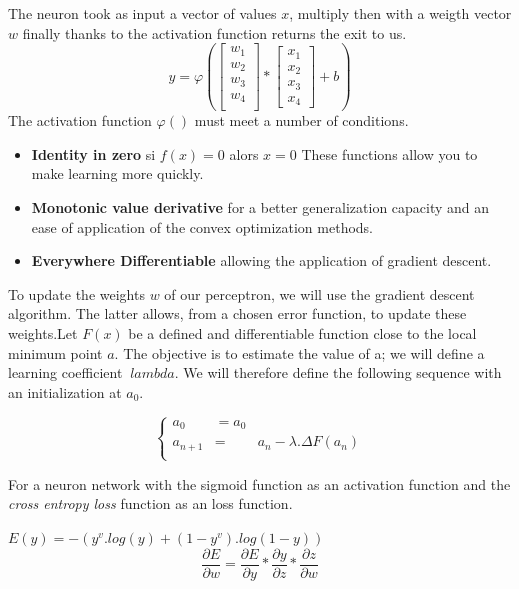 \documentclass[twoside,twocolumn]{article}
\begin{document}
The neuron took as input a vector of values $x$, multiply then with a weigth vector $w$ finally thanks to the activation function returns 
the exit to us.
\[
y = \varphi(
\left[
  \begin{array}{ccc}
    w_{1}\\
    w_{2}\\
    w_{3}\\
    w_{4}\\  
  \end{array}
\right]*
\begin{bmatrix}
           x_{1} \\
           x_{2} \\
           x_{3} \\
           x_{4}
         \end{bmatrix}
+ b)\]
The activation function $\varphi()$ must meet a number of conditions.
\begin{itemize}
  \item \textbf{Identity in zero} si $f(x) = 0$ alors $x = 0$ \cite{Sussillo2014RandomWI} These functions allow you to make learning more 
  quickly.
  \item \textbf{Monotonic value derivative}\cite{WU20093432} for a better generalization capacity and an ease of application of the convex 
  optimization methods.
  \item \textbf{Everywhere Differentiable}\cite{Rumelhart1} allowing the application of gradient descent.
\end{itemize}

To update the weights $ w $ of our perceptron, we will use the gradient descent algorithm. The latter allows, from a chosen error function, 
to update these weights.Let $ F (x) $ be a defined and differentiable function close to the local minimum point $ a $. The objective is to 
estimate the value of a; we will define a learning coefficient $ \ lambda $. We will therefore define the following sequence with an 
initialization at $ a_0 $.

\[\left\{
  \begin{array}{rcr}
    a_{0} & =  a_0 \\
    a_{n+1} & = & a_{n} - \lambda. \Delta F(a_n)\\
  \end{array}
\right.\]

For a neuron network with the sigmoid function as an activation function and the \textit{cross entropy loss} function as an loss function.

$E(y) = -(y^v.log(y) + (1-y^v).log(1-y))$
\[ \frac{\partial E}{\partial w}
   = \frac{\partial E}{\partial y}
   *\frac{\partial y}{\partial z}
      *\frac{\partial z}{\partial w}\]
\end{document}
